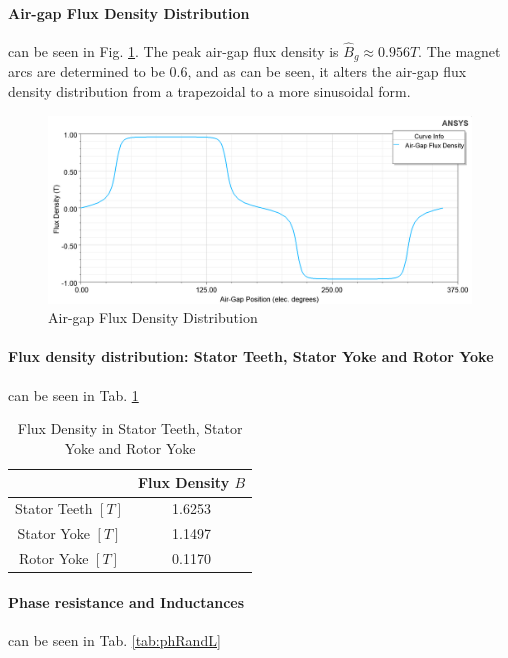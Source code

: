 \documentclass [a4 paper, 11pt, titlepage] {article}
\begin{document}
	
	\paragraph{Air-gap Flux Density Distribution} can be seen in Fig. \ref{fig:airgapFluxDensityDist}. The peak air-gap flux density is $\hat{B}_g\approx0.956T$. The magnet arcs are determined to be $0.6$, and as can be seen, it alters the air-gap flux density distribution from a trapezoidal to a more sinusoidal form.
	
	\begin{figure}[h]
		\includegraphics[width=\textwidth]{airgapFluxDensityDist.png}
		\caption{Air-gap Flux Density Distribution}
		\label{fig:airgapFluxDensityDist}
	\end{figure}
	
	\paragraph{Flux density distribution: Stator Teeth, Stator Yoke and Rotor Yoke} can be seen in Tab. \ref{tab:fluxDensityinCrit.}
	
	
	\begin{table}[h]
		\begin{center}
			\begin{tabular}{c|c}
				& Flux Density $B$ \\
				\hline
				Stator Teeth $[T]$ & 1.6253 \\
				\hline\hline
				Stator Yoke $[T]$ & 1.1497 \\
				\hline
				Rotor Yoke $[T]$ & 0.1170 \\
			\end{tabular}
		\end{center}
		\caption{Flux Density in Stator Teeth, Stator Yoke and Rotor Yoke}
		\label{tab:fluxDensityinCrit.}
	\end{table}
	
	
	\paragraph{Phase resistance and Inductances} can be seen in Tab. \ref{tab:phRandL}
	
\end{document}

